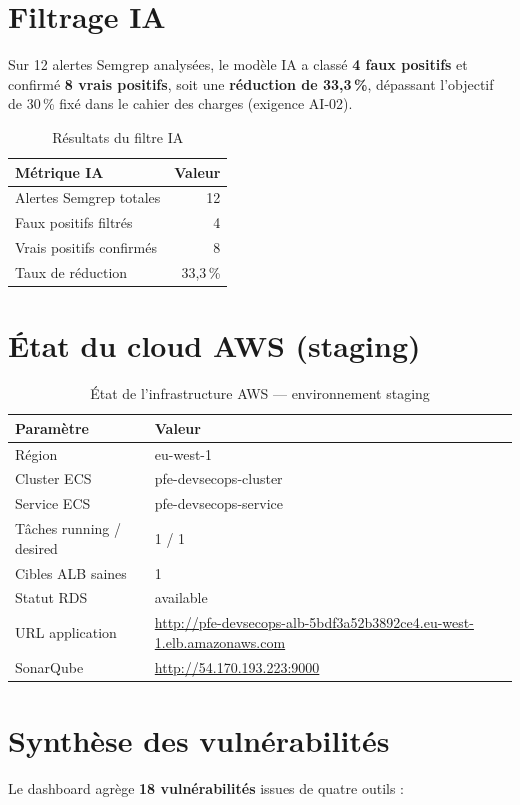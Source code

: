 \documentclass[12pt,a4paper]{report}
\begin{document}
\section{Filtrage IA}
Sur 12 alertes Semgrep analysées, le modèle IA a classé \textbf{4 faux positifs} et confirmé \textbf{8 vrais positifs}, soit une \textbf{réduction de 33,3\,\%}, dépassant l'objectif de 30\,\% fixé dans le cahier des charges (exigence AI-02).

\begin{table}[H]
\centering
\begin{tabular}{@{}lr@{}}
\toprule
\textbf{Métrique IA} & \textbf{Valeur} \\
\midrule
Alertes Semgrep totales & 12 \\
Faux positifs filtrés & 4 \\
Vrais positifs confirmés & 8 \\
Taux de réduction & 33,3\,\% \\
\bottomrule
\end{tabular}
\caption{Résultats du filtre IA}
\label{tab:ai}
\end{table}

\section{État du cloud AWS (staging)}
\begin{table}[H]
\centering
\begin{tabular}{@{}ll@{}}
\toprule
\textbf{Paramètre} & \textbf{Valeur} \\
\midrule
Région & eu-west-1 \\
Cluster ECS & pfe-devsecops-cluster \\
Service ECS & pfe-devsecops-service \\
Tâches running / desired & 1 / 1 \\
Cibles ALB saines & 1 \\
Statut RDS & available \\
URL application & \url{http://pfe-devsecops-alb-5bdf3a52b3892ce4.eu-west-1.elb.amazonaws.com} \\
SonarQube & \url{http://54.170.193.223:9000} \\
\bottomrule
\end{tabular}
\caption{État de l'infrastructure AWS --- environnement staging}
\label{tab:cloud}
\end{table}

\section{Synthèse des vulnérabilités}
Le dashboard agrège \textbf{18 vulnérabilités} issues de quatre outils :
\end{document}
